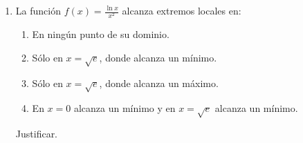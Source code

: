 \documentclass[12pt]{article}
\theoremstyle{definition}
\begin{document}
\begin{enumerate}
\item  
La función $f(x) = \frac{\ln x}{x^2}$ alcanza extremos locales en:
\begin{enumerate}
\item En ningún punto de su dominio.
\item Sólo en $x = \sqrt{e}$, donde alcanza un mínimo.
\item Sólo en $x = \sqrt{e}$, donde alcanza un máximo.
\item En $x = 0$ alcanza un mínimo y en $x = \sqrt{e}$ alcanza un mínimo.
\end{enumerate}
Justificar.

\end{enumerate}
\end{document}
